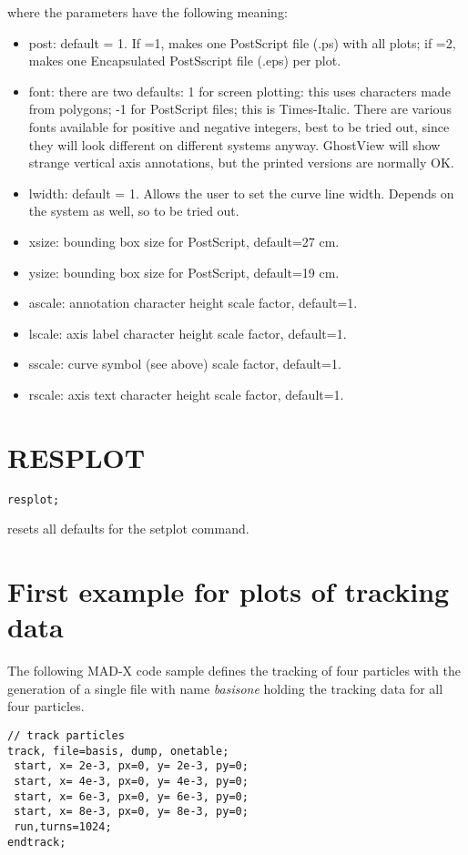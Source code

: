 where the parameters have the following meaning: 
\begin{itemize}
   \item post: default = 1. If =1, makes one PostScript file (.ps) with
     all plots; if =2, makes one Encapsulated PostSscript file (.eps)
     per plot.   
   \item font: there are two defaults: 1 for screen plotting: this uses
     characters made from polygons; -1 for PostScript files; this is
     Times-Italic. There are various fonts available for positive and
     negative integers, best to be tried out, since they will look
     different on different systems anyway. GhostView will show strange
     vertical axis annotations, but the printed versions are normally
     OK.   
   \item lwidth: default = 1. Allows the user to set the curve line
     width.  Depends on the system as well, so to be tried out.   
   \item xsize: bounding box size for PostScript, default=27 cm.   
   \item ysize: bounding box size for PostScript, default=19 cm.   
   \item ascale: annotation character height scale factor, default=1.   
   \item lscale: axis label character height scale factor, default=1.  
   \item sscale: curve symbol (see above) scale factor, default=1.  
   \item rscale: axis text character height scale factor, default=1.  
\end{itemize}


\section{RESPLOT}
\begin{verbatim}
resplot; 
\end{verbatim} 
resets all defaults for the setplot command.  


\section{First example for plots of tracking data}

The following MAD-X code sample defines the tracking of four particles 
with the generation of a single file with name \textit{basisone} 
holding the tracking data for all four particles.  

\begin{verbatim}
// track particles
track, file=basis, dump, onetable;
 start, x= 2e-3, px=0, y= 2e-3, py=0;
 start, x= 4e-3, px=0, y= 4e-3, py=0;
 start, x= 6e-3, px=0, y= 6e-3, py=0;
 start, x= 8e-3, px=0, y= 8e-3, py=0;
 run,turns=1024;
endtrack;
\end{verbatim}

